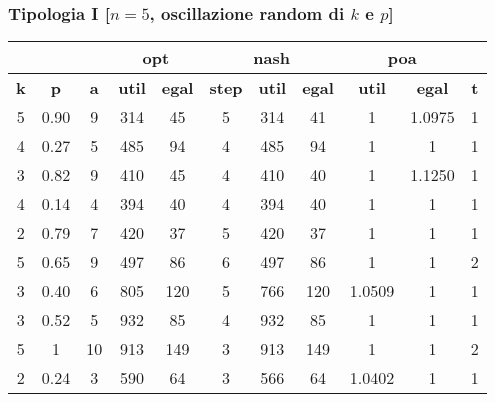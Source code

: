 \documentclass{beamer}
\begin{document}
\begin{frame}
\frametitle{Tipologia I [$n=5$, oscillazione random di $k$ e $p$]}
\begin{table}[H]
\centering
\scalebox{0.9} {
\begin{tabular}{|c|c|c|c|c|c|c|c|c|c|c|}
\hline
\multicolumn{3}{|c|}{\textbf{}} & \multicolumn{2}{c|}{\textbf{\color{orange}opt}} & \multicolumn{3}{c|}{\textbf{\color{orange}nash}} & \multicolumn{2}{c|}{\textbf{\color{orange}poa}} & \textbf{} \\ \hline
\textbf{\alert{k}} & \textbf{\alert{p}} & \textbf{a} & \textbf{util} & \textbf{egal} & \textbf{step} & \textbf{util} & \textbf{egal} & \textbf{util} & \textbf{egal} & \textbf{t} \\ \hline
5 & 0.90 & 9 & 314 & 45 & 5 & 314 & 41 & 1 & 1.0975 & 1 \\ \hline
4 & 0.27 & 5 & 485 & 94 & 4 & 485 & 94 & 1 & 1 & 1 \\ \hline
3 & 0.82 & 9 & 410 & 45 & 4 & 410 & 40 & 1 & 1.1250 & 1 \\ \hline
4 & 0.14 & 4 & 394 & 40 & 4 & 394 & 40 & 1 & 1 & 1 \\ \hline
2 & 0.79 & 7 & 420 & 37 & 5 & 420 & 37 & 1 & 1 & 1 \\ \hline
5 & 0.65 & 9 & 497 & 86 & 6 & 497 & 86 & 1 & 1 & 2 \\ \hline
3 & 0.40 & 6 & 805 & 120 & 5 & 766 & 120 & 1.0509 & 1 & 1 \\ \hline
3 & 0.52 & 5 & 932 & 85 & 4 & 932 & 85 & 1 & 1 & 1 \\ \hline
5 & 1 & 10 & 913 & 149 & 3 & 913 & 149 & 1 & 1 & 2 \\ \hline
2 & 0.24 & 3 & 590 & 64 & 3 & 566 & 64 & 1.0402 & 1 & 1 \\ \hline
\end{tabular}
}
\end{table}
\end{frame}
\end{document}
